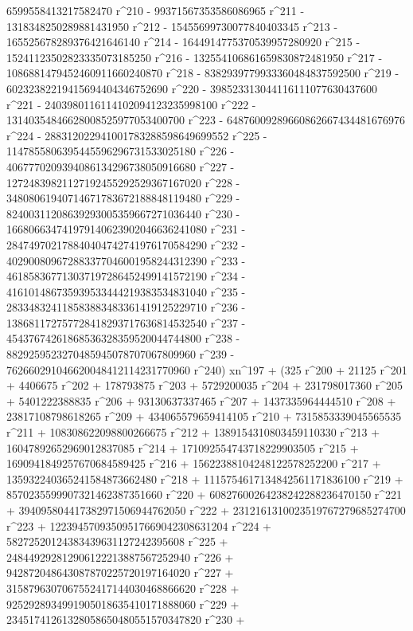        6599558413217582470 r^210 - 99371567353586086965 r^211 - 
       1318348250289881431950 r^212 - 15455699730077840403345 r^213 - 
       165525678289376421646140 r^214 - 
       1644914775370539957280920 r^215 - 
       15241123502823335073185250 r^216 - 
       132554106861659830872481950 r^217 - 
       1086881479452460911660240870 r^218 - 
       8382939779933360484837592500 r^219 - 
       60232382219415694404346752690 r^220 - 
       398523313044116111077630437600 r^221 - 
       2403980116114102094123235998100 r^222 - 
       13140354846628008525977053400700 r^223 - 
       64876009289660862667434481676976 r^224 - 
       288312022941001783288598649699552 r^225 - 
       1147855806395445596296731533025180 r^226 - 
       4067770209394086134296738050916680 r^227 - 
       12724839821127192455292529367167020 r^228 - 
       34808061940714671783672188848119480 r^229 - 
       82400311208639293005359667271036440 r^230 - 
       166806634741979140623902046636241080 r^231 - 
       284749702178840404742741976170584290 r^232 - 
       402900809672883377046001958244312390 r^233 - 
       461858367713037197286452499141572190 r^234 - 
       416101486735939533444219383534831040 r^235 - 
       283348324118583883483361419125229710 r^236 - 
       138681172757728418293717636814532540 r^237 - 
       45437674261868536328359520044744800 r^238 - 
       8829259523270485945078707067809960 r^239 - 
       762660291046620048412114231770960 r^240) xn^197 + (325 r^200 + 
       21125 r^201 + 4406675 r^202 + 178793875 r^203 + 
       5729200035 r^204 + 231798017360 r^205 + 5401222388835 r^206 + 
       93130637337465 r^207 + 1437335964444510 r^208 + 
       23817108798618265 r^209 + 434065579659414105 r^210 + 
       7315853339045565535 r^211 + 108308622098800266675 r^212 + 
       1389154310803459110330 r^213 + 16047892652969012837085 r^214 + 
       171092554743718229903505 r^215 + 
       1690941849257670684589425 r^216 + 
       15622388104248122578252200 r^217 + 
       135932240365241584873662480 r^218 + 
       1115754617134842561171836100 r^219 + 
       8570235599907321462387351660 r^220 + 
       60827600264238242288236470150 r^221 + 
       394095804417382971506944762050 r^222 + 
       2312161310023519767279685274700 r^223 + 
       12239457093509517669042308631204 r^224 + 
       58272520124383439631127242395608 r^225 + 
       248449292812906122213887567252940 r^226 + 
       942872048643087870225720197164020 r^227 + 
       3158796307067552417144030468866620 r^228 + 
       9252928934991905018635410171888060 r^229 + 
       23451741261328058650480551570347820 r^230 + 
